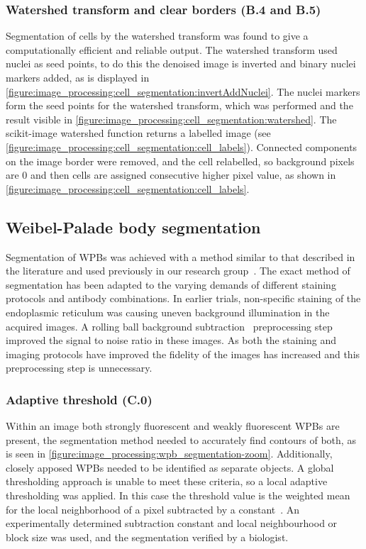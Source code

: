 \subsubsection{Watershed transform and clear borders (B.4 and B.5)}
Segmentation of cells by the watershed transform was found to give a computationally efficient and reliable output. The watershed transform used nuclei as seed points, to do this the denoised image is inverted and binary nuclei markers added, as is displayed in \autoref{figure:image_processing:cell_segmentation:invertAddNuclei}. The nuclei markers form the seed points for the watershed transform, which was performed and the result visible in \autoref{figure:image_processing:cell_segmentation:watershed}. The scikit-image watershed function returns a labelled image (see \autoref{figure:image_processing:cell_segmentation:cell_labels}). Connected components on the image border were removed, and the cell relabelled, so background pixels are 0 and then cells are assigned consecutive higher pixel value, as shown in \autoref{figure:image_processing:cell_segmentation:cell_labels}.

\subsection{Weibel-Palade body segmentation}
\label{endothelial_morphometry:image_processing:wpb}
Segmentation of WPBs was achieved with a method similar to that described in the literature and used previously in our research group~\cite{Ferraro2014, Stevenson2014}. The exact method of segmentation has been adapted to the varying demands of different staining protocols and antibody combinations. In earlier trials, non-specific staining of the endoplasmic reticulum was causing uneven background illumination in the acquired images. A rolling ball background subtraction~\cite{Sternberg1983} preprocessing step improved the signal to noise ratio in these images. As both the staining and imaging protocols have improved the fidelity of the images has increased and this preprocessing step is unnecessary.

\subsubsection{Adaptive threshold (C.0)}
Within an image both strongly fluorescent and weakly fluorescent WPBs are present, the segmentation method needed to accurately find contours of both, as is seen in \autoref{figure:image_processing:wpb_segmentation-zoom}. Additionally, closely apposed WPBs needed to be identified as separate objects. A global thresholding approach is unable to meet these criteria, so a local adaptive thresholding was applied. In this case the threshold value is the weighted mean for the local neighborhood of a pixel subtracted by a constant~\cite{scikit-image}. An experimentally determined subtraction constant and local neighbourhood or block size was used, and the segmentation verified by a biologist.

